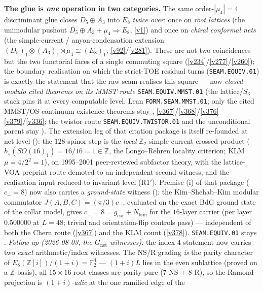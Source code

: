 \documentclass[11pt,a4paper]{article}
\newcommand{\gcar}{g_{\mathrm{car}}}
\newcommand{\Nfam}{N_{\mathrm{fam}}}
\newcommand{\Z}{\mathbb{Z}}
\theoremstyle{definition}
\begin{document}
\par\smallskip\noindent\textbf{The glue is \emph{one} operation in two categories.} The same
order-$|\mu_4|{=}4$ discriminant glue closes $D_5\oplus A_3$ into $E_8$ \emph{twice over}: once on
\emph{root lattices} (the unimodular pushout $D_5\oplus A_3+\mu_4\Rightarrow E_8$, \vref{v1}) and once on
\emph{chiral conformal nets} (the simple-current / anyon-condensation extension
$(D_5)_1\otimes(A_3)_1\rtimes\mu_4\cong(E_8)_1$, \vref{v92}/\vref{v281}). These are not two coincidences but
the two functorial faces of a single commuting square (\vref{v234}/\vref{v277}/\vref{v260}); the boundary
realisation on which the strict-TOE residual turns (\texttt{SEAM.EQUIV.01}) is exactly the statement that the
raw seam realises this square --- now \emph{closed modulo cited theorems on its MMST route}
\texttt{SEAM.EQUIV.MMST.01} (the lattice/$S_3$ stack pins it at
every computable level, Lean \texttt{FORM.SEAM.MMST.01}; only the cited MMST/OS continuum-existence theorems stay
\mO, \vref{v367}/\vref{v368}/\vref{v376}--\vref{v379}/\vref{v336}; the twistor route
\texttt{SEAM.EQUIV.TWISTOR.01} and the unconditional parent stay \mO). The extension leg of that citation package is
itself re-founded at net level (): the $128$-spinor step is the
\emph{local} $\Z_2$ simple-current crossed product ($h_s(SO(16)_1)=16/16=1\in\Z$, the Longo--Rehren locality
criterion; KLM $\mu=4/2^2=1$), on 1995--2001 peer-reviewed subfactor theory, with the lattice-VOA preprint route
demoted to an independent second witness, and the realisation input reduced to invariant level (R1$'$).
Premise (i) of that package ($c_-{=}8$) now also carries a \emph{ground-state} witness
(): the Kim--Shehab--Kim modular commutator
$J(A,B,C)=(\pi/3)c_-$, evaluated on the exact BdG ground state of the collar model, gives $c_-=8=\gcar+\Nfam$
for the $16$-layer carrier (per layer $0.500000$ at $L{=}48$; trivial and orientation-flip controls pass) ---
independent of both the Chern route (\vref{v367}) and the KLM count (\vref{v378}).
\texttt{SEAM.EQUIV.01} stays \mO.
\emph{Follow-up (2026-08-03, the $G_{\mathrm{net}}$ witnesses):} the
index-$4$ statement now carries two \emph{exact} arithmetic/index
witnesses.  The NS/R grading \emph{is} the parity character of
$E_8(\Z[i])/(1{+}i)=\mathbb F_2^4$ --- $(1{+}i)L$ lies in the even
sublattice (proved on a $\Z$-basis), all $15\times16$ root classes
are parity-pure ($7$ NS $+$ $8$ R), so the Ramond projection is
$(1{+}i)$-\emph{adic} at the one ramified edge of the
\end{document}
